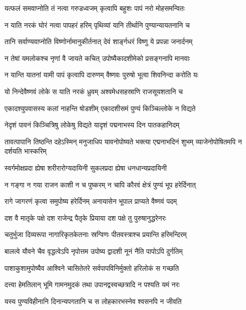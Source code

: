 \twolineshloka
{यत्फलं समवाप्नोति तं नत्वा गरुडध्वजम्}
{कृत्वापि बहुशः पापं नरो मोहसमन्वितः} %

\twolineshloka
{न याति नरकं घोरं नत्वा पापहरं हरिम्}
{पृथिव्यां यानि तीर्थानि पुण्यान्यायतनानि च} %

\twolineshloka
{तानि सर्वाण्यवाप्नोति विष्णोर्नामानुकीर्तनात्}
{देवं शार्ङ्गधरं विष्णु ये प्रपन्ना जनार्दनम्} %

\twolineshloka
{न तेषां यमलोकश्च नृणां वै जायते कचित्}
{उपोष्यैकादशीमेको प्रसङ्गनापि मानवाः} %

\twolineshloka
{न यान्ति यातनां यामी पापं कृत्वापि दारुणम्}
{वैष्णवः पुरुषो भूत्वा शिवनिन्दा करोति यः} %

\twolineshloka
{यो निन्देवैष्णवं लोके स याति नरकं ध्रुवम्}
{अश्वमेधसहस्राणि राजसूयशतानि च} %

\twolineshloka
{एकादश्युपवासस्य कलां नाहन्ति षोडशीम्}
{एकादशीसमं पुण्यं किञ्चिल्लोके न विद्यते} %

\twolineshloka
{नेदृशं पावनं किञ्चित्रिषु लोकेषु विद्यते}
{यादृशं पद्मनाभस्य दिन पातकहानिदम्} %


\threelineshloka
{तावत्पापानि तिष्ठन्ति दहेऽस्मिन् मनुजाधिप}
{यावनोपोष्यते भक्त्या एद्मनाभदिनं शुभम्}
{व्याजेनोपोषितमपि न दर्शयति भास्करिम्} %

\twolineshloka
{स्वर्गमोक्षप्रदा ह्येषा शरीरारोग्यदायिनी}
{सुकलप्रदा ह्येषा धनधान्यप्रदायिनी} %

\twolineshloka
{न गङ्गा न गया राजन काशी न च पुष्करम्}
{न चापि कौरवं क्षेत्रं पुण्यं भूप हरेर्दिनात्} %

\twolineshloka
{रागे जागरणं कृत्वा समुपोष्य हरेर्दिनम्}
{अनायासेन भूपाल प्राप्यते वैष्णवं पदम्} %

\twolineshloka
{दश वै मातृके पक्षे दश राजेन्द्र पैतृके}
{प्रियाया दश पक्षे तु पुरुषानुद्धरेनरः} %

\twolineshloka
{चतुर्भुजा दिव्यरूपा नागारिकृतकेतनाः}
{स्रग्विणः पीतवस्त्राश्च प्रयान्ति हरिमन्दिरम्} %

\twolineshloka
{बालत्वे यौवने चैव वृद्धत्वेऽपि नृपोत्तम}
{उपोष्य द्वादशी नूनं नैति पापोऽपि दुर्गतिम्} %

\twolineshloka
{पाशाकुशामुपोष्यैव आश्विने चासितेतरे}
{सर्वपापविनिर्मुक्तो हरिलोकं स गच्छति} %

\twolineshloka
{दत्त्वा हेमतिलान् भूमि गामनमुदकं तथा}
{उपानद्वस्वच्छत्रादि न पश्यति यमं नरः} %

\twolineshloka
{यस्य पुण्यविहीनानि दिनान्यपगतानि च}
{स लोहकारभस्नेव श्वसनपि न जीवति} %

